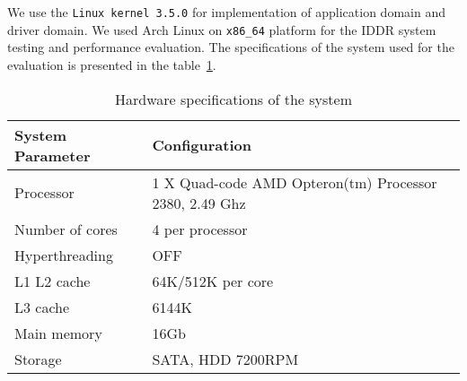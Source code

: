 We use the \texttt{Linux kernel 3.5.0} for implementation of application domain and driver domain. We used Arch Linux on \texttt{x86\_64} platform for the IDDR system testing and performance evaluation. The specifications of the system used for the evaluation is presented in the table~\ref{tab:config}. 

\begin{table}
\caption{Hardware specifications of the system}
\begin{center}
\begin{tabular}{ll}
  \hline
  \label{tab:config}
  System Parameter & Configuration \\
  \hline
  Processor & 1 X Quad-code AMD Opteron(tm) Processor 2380, 2.49 Ghz \\
  Number of cores & 4 per processor \\
  Hyperthreading & OFF \\
  L1 L2 cache & 64K/512K per core \\
  L3 cache & 6144K \\
  Main memory & 16Gb \\
  Storage & SATA, HDD 7200RPM \\
  \hline 
\end{tabular}
\end{center}
\end{table}

